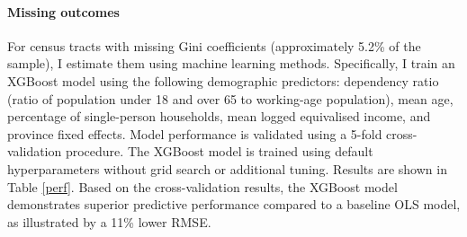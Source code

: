 \paragraph{Missing outcomes} For census tracts with missing Gini coefficients (approximately 5.2\% of the sample), I estimate them using machine learning methods. Specifically, I train an XGBoost model using the following demographic predictors: dependency ratio (ratio of population under 18 and over 65 to working-age population), mean age, percentage of single-person households, mean logged equivalised income, and province fixed effects. Model performance is validated using a 5-fold cross-validation procedure. The XGBoost model is trained using default hyperparameters without grid search or additional tuning. Results are shown in Table \ref{perf}. Based on the cross-validation results, the XGBoost model demonstrates superior predictive performance compared to a baseline OLS model, as illustrated by a 11\% lower RMSE.

\begin{table}[H]
\centering
{}
\end{table}


